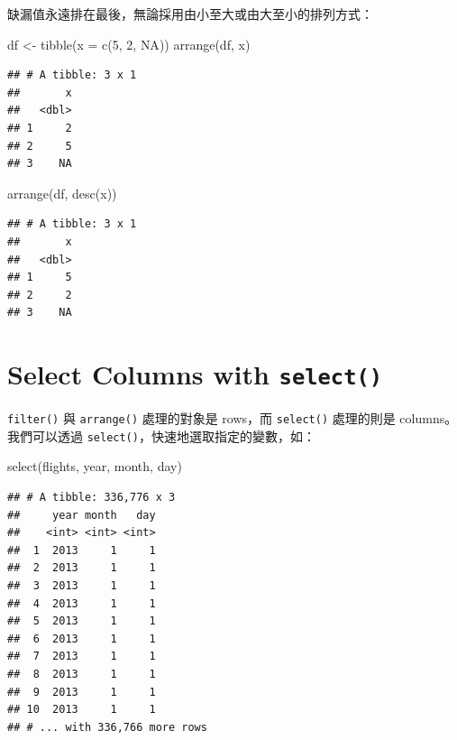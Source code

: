 \documentclass[
]{book}
\newenvironment{Shaded}{\begin{snugshade}}{\end{snugshade}}
\newcommand{\AttributeTok}[1]{\textcolor[rgb]{0.77,0.63,0.00}{#1}}
\newcommand{\ConstantTok}[1]{\textcolor[rgb]{0.00,0.00,0.00}{#1}}
\newcommand{\DecValTok}[1]{\textcolor[rgb]{0.00,0.00,0.81}{#1}}
\newcommand{\FunctionTok}[1]{\textcolor[rgb]{0.00,0.00,0.00}{#1}}
\newcommand{\NormalTok}[1]{#1}
\newcommand{\OtherTok}[1]{\textcolor[rgb]{0.56,0.35,0.01}{#1}}
\theoremstyle{definition}
\theoremstyle{remark}
\begin{document}
缺漏值永遠排在最後，無論採用由小至大或由大至小的排列方式：

\begin{Shaded}
\begin{Highlighting}[]
\NormalTok{df }\OtherTok{\textless{}{-}} \FunctionTok{tibble}\NormalTok{(}\AttributeTok{x =} \FunctionTok{c}\NormalTok{(}\DecValTok{5}\NormalTok{, }\DecValTok{2}\NormalTok{, }\ConstantTok{NA}\NormalTok{))}
\FunctionTok{arrange}\NormalTok{(df, x)}
\end{Highlighting}
\end{Shaded}

\begin{verbatim}
## # A tibble: 3 x 1
##       x
##   <dbl>
## 1     2
## 2     5
## 3    NA
\end{verbatim}

\begin{Shaded}
\begin{Highlighting}[]
\FunctionTok{arrange}\NormalTok{(df, }\FunctionTok{desc}\NormalTok{(x))}
\end{Highlighting}
\end{Shaded}

\begin{verbatim}
## # A tibble: 3 x 1
##       x
##   <dbl>
## 1     5
## 2     2
## 3    NA
\end{verbatim}

\hypertarget{select}{%
\section{\texorpdfstring{Select Columns with \texttt{select()}}{Select Columns with select()}}\label{select}}

\texttt{filter()} 與 \texttt{arrange()} 處理的對象是 rows，而 \texttt{select()} 處理的則是 columns。我們可以透過 \texttt{select()}，快速地選取指定的變數，如：

\begin{Shaded}
\begin{Highlighting}[]
\FunctionTok{select}\NormalTok{(flights, year, month, day)}
\end{Highlighting}
\end{Shaded}

\begin{verbatim}
## # A tibble: 336,776 x 3
##     year month   day
##    <int> <int> <int>
##  1  2013     1     1
##  2  2013     1     1
##  3  2013     1     1
##  4  2013     1     1
##  5  2013     1     1
##  6  2013     1     1
##  7  2013     1     1
##  8  2013     1     1
##  9  2013     1     1
## 10  2013     1     1
## # ... with 336,766 more rows
\end{verbatim}
\end{document}
